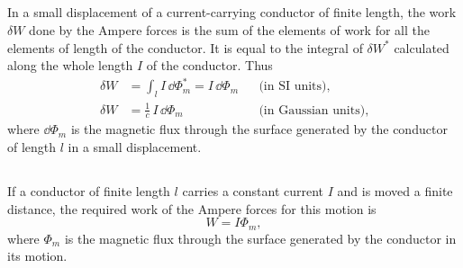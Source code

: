 \subsection{}\label{23.6.2} In a small displacement of a current-carrying conductor of finite length, the work $\delta W$ done by the Ampere forces is the sum of the elements of work for all the elements of length of the
conductor. It is equal to the integral of $\delta W^{*}$ calculated along the whole length $I$ of the conductor. Thus
\begin{align*}%
\delta W & = \int_{l} I \, \dd \Phi_{m}^{*} = I \, \dd \Phi_{m}&&  \text{(in SI units),} \\
\delta W & = \frac{1}{c}\,I \, \dd \Phi_{m}&&  \text{(in Gaussian units),}
\end{align*}
where $\dd \Phi_{m}$ is the magnetic flux through the surface generated by the conductor of length $l$ in a small displacement.

\subsection{}\label{23.6.3} If a conductor of finite length $l$ carries a constant current $I$ and is moved a finite distance, the required work of the Ampere forces for this motion is
\begin{equation*}%
W = I \Phi_{m},
\end{equation*}
where $\Phi_{m}$ is the magnetic flux through the surface generated by the conductor in its motion.

